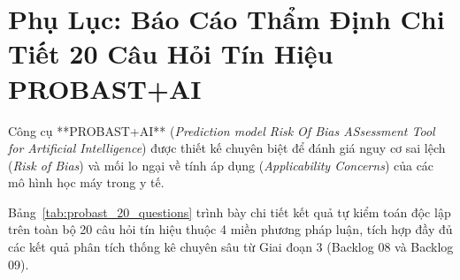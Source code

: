 \section{Phụ Lục: Báo Cáo Thẩm Định Chi Tiết 20 Câu Hỏi Tín Hiệu PROBAST+AI}
\label{sec:appendix_probast_ai}

Công cụ **PROBAST+AI** (\textit{Prediction model Risk Of Bias ASsessment Tool for Artificial Intelligence}) \cite{probastai2024bmj} được thiết kế chuyên biệt để đánh giá nguy cơ sai lệch (\textit{Risk of Bias}) và mối lo ngại về tính áp dụng (\textit{Applicability Concerns}) của các mô hình học máy trong y tế. 

Bảng~\ref{tab:probast_20_questions} trình bày chi tiết kết quả tự kiểm toán độc lập trên toàn bộ 20 câu hỏi tín hiệu thuộc 4 miền phương pháp luận, tích hợp đầy đủ các kết quả phân tích thống kê chuyên sâu từ Giai đoạn 3 (Backlog 08 và Backlog 09).

